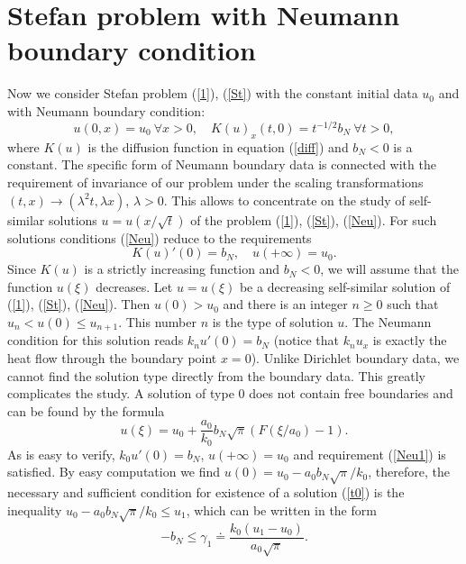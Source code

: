 \documentclass[10pt,a4paper]{amsart}
\numberwithin{equation}{section}
\begin{document}
\section{Stefan problem with Neumann boundary condition}

Now we consider Stefan problem (\ref{1}), (\ref{St})
with the constant initial data $u_0$ and with Neumann boundary condition:
\begin{equation}\label{Neu}
u(0,x)=u_0 \ \forall x>0, \quad K(u)_x(t,0)=t^{-1/2} b_N \ \forall t>0,
\end{equation}
where $K(u)$ is the diffusion function in equation (\ref{diff}) and $b_N<0$ is a constant. The specific form of Neumann boundary data is connected with the requirement of invariance of our problem under the scaling transformations $(t,x)\to (\lambda^2 t,\lambda x)$, $\lambda>0$. This allows to concentrate on the study of self-similar solutions $u=u(x/\sqrt{t})$ of the problem (\ref{1}), (\ref{St}), (\ref{Neu}).
For such solutions conditions (\ref{Neu}) reduce to the requirements
\begin{equation}\label{Neu1}
K(u)'(0)=b_N, \quad u(+\infty)=u_0.
\end{equation}
Since $K(u)$ is a strictly increasing function and $b_N<0$, we will assume that the function $u(\xi)$ decreases.
Let $u=u(\xi)$ be a decreasing self-similar solution of (\ref{1}), (\ref{St}), (\ref{Neu}). Then $u(0)>u_0$ and there is an integer $n\ge 0$ such that $u_n<u(0)\le u_{n+1}$. This number $n$ is the type of solution $u$. The Neumann condition for this solution reads $k_nu'(0)=b_N$
(notice that $k_nu_x$ is exactly the heat flow through the boundary point $x=0$).
Unlike Dirichlet boundary data, we cannot find the solution type directly from the boundary data. This greatly complicates the study.
A solution of type $0$ does not contain free boundaries and can be found by the formula
\begin{equation}\label{t0}
u(\xi)=u_0+\frac{a_0}{k_0}b_N\sqrt{\pi}(F(\xi/a_0)-1).
\end{equation}
As is easy to verify, $k_0u'(0)=b_N$, $u(+\infty)=u_0$ and requirement (\ref{Neu1}) is satisfied. By easy computation we find $u(0)=u_0-a_0b_N\sqrt{\pi}/k_0$, therefore, the necessary and sufficient condition for existence of a solution (\ref{t0}) is the
inequality $u_0-a_0b_N\sqrt{\pi}/k_0\le u_1$, which can be written in the form
\begin{equation}\label{con0}
-b_N\le \gamma_1\doteq\frac{k_0(u_1-u_0)}{a_0\sqrt{\pi}}.
\end{equation}
\end{document}
